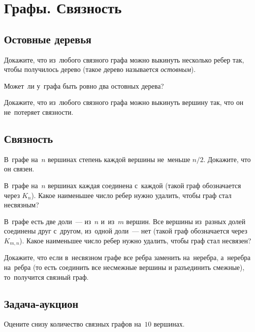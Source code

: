 
\section*{Графы. Связность}



\subsection*{Остовные деревья}

\begin{problems}

\item
Докажите, что из~любого связного графа можно выкинуть несколько ребер так,
чтобы получилось дерево (такое дерево называется \emph{остовным}).

\item
Может~ли у~графа быть ровно два остовных дерева?

\item
Докажите, что из~любого связного графа можно выкинуть вершину так, что он
не~потеряет связности.

\end{problems}


\subsection*{Связность}

\begin{problems}


\item
В~графе на~$n$ вершинах степень каждой вершины не~меньше $n / 2$.
Докажите, что он связен.

\item
В~графе на~$n$ вершинах каждая соединена с~каждой (такой граф обозначается
через $K_n$).
Какое наименьшее число ребер нужно удалить, чтобы граф стал несвязным?

\item
В~графе есть две доли~--- из~$n$ и~из~$m$ вершин.
Все вершины из~разных долей соединены друг с~другом, из~одной доли~--- нет
(такой граф обозначается через $K_{m,n}$).
Какое наименьшее число ребер нужно удалить, чтобы граф стал несвязен?

\item
Докажите, что если в~несвязном графе все ребра заменить на~неребра, а~неребра
на~ребра (то есть соединить все несмежные вершины и разъединить смежные),
то~получится связный граф.

\end{problems}


\subsection*{Задача-аукцион}

\begin{problems}

\item
Оцените снизу количество связных графов на~$10$ вершинах.

\end{problems}

